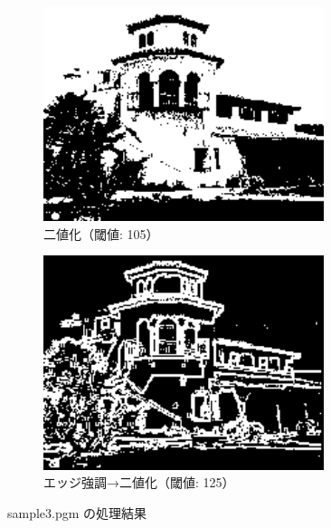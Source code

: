 \documentclass[a4paper,12pt]{jsarticle}
\begin{document}
\begin{figure}[!htbp]
\begin{subfigure}[b]{0.45\textwidth}
    \centering
    \includegraphics[width=0.9\textwidth]{./images/binarized_sample3_binary.png}
    \caption{二値化（閾値: 105）}
\end{subfigure}
\hfill
\begin{subfigure}[b]{0.45\textwidth}
    \centering
    \includegraphics[width=0.9\textwidth]{./images/combined_sample3_combined.png}
    \caption{エッジ強調→二値化（閾値: 125）}
\end{subfigure}
\caption{sample3.pgm の処理結果}
\label{fig:sample3}
\end{figure}
\end{document}
